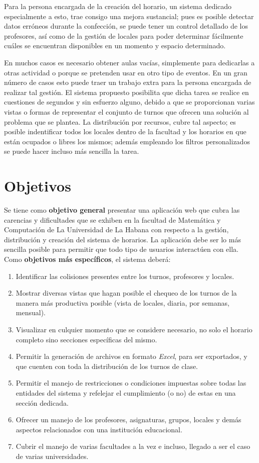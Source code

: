 Para la persona encargada de la creación del horario, un sistema dedicado especialmente a esto, trae consigo una mejora sustancial; pues es posible detectar datos erróneos durante la confección, se puede tener un control detallado de los profesores, así como de la gestión de locales para poder determinar fácilmente cuáles se encuentran disponibles en un momento y espacio determinado.
	
En muchos casos es necesario obtener aulas vacías, simplemente para dedicarlas a otras actividad o porque se pretenden usar en otro tipo de eventos. En un gran número de casos esto puede traer un trabajo extra para la persona encargada de realizar tal gestión. El sistema propuesto posibilita que dicha tarea se realice en cuestiones de segundos y sin esfuerzo alguno, debido a que se proporcionan varias vistas o formas de representar el conjunto de turnos que ofrecen una solución al problema que se plantea. La distribución por recursos, cubre tal aspecto; es posible indentificar todos los locales dentro de la facultad y los horarios en que están ocupados o libres los mismos; además empleando los filtros personalizados se puede hacer incluso más sencilla la tarea.

	
\section{Objetivos}
Se tiene como \textbf{objetivo general} presentar una aplicación web que cubra las carencias y dificultades que se exhiben en la facultad de Matemática y Computación de La Universidad de La Habana con respecto a la gestión, distribución y creación del sistema de horarios. 
La aplicación debe ser lo más sencilla posible para permitir que todo tipo de usuarios interactúen con ella. Como \textbf{objetivos más específicos}, el sistema deberá:
\begin{enumerate}
	\item Identificar las colisiones presentes entre los turnos, profesores y locales.
	\item Mostrar diversas vistas que hagan posible el chequeo de los turnos de la manera más productiva posible (vista de locales, diaria, por semanas, mensual).
	\item Visualizar en culquier momento que se considere necesario, no solo el horario completo sino secciones específicas del mismo.
	\item Permitir la generación de archivos en formato \textit{Excel}, para ser exportados, y que cuenten con toda la distribución de los turnos de clase.
	\item Permitir el manejo de restricciones o condiciones impuestas sobre todas las entidades del sistema y refelejar el cumplimiento (o no) de estas en una sección dedicada.
	\item Ofrecer un manejo de los profesores, asignaturas, grupos, locales y demás aspectos relacionados con una institución educacional.
	\item Cubrir el manejo de varias facultades a la vez e incluso, llegado a ser el caso de varias universidades. 
\end{enumerate}
	
